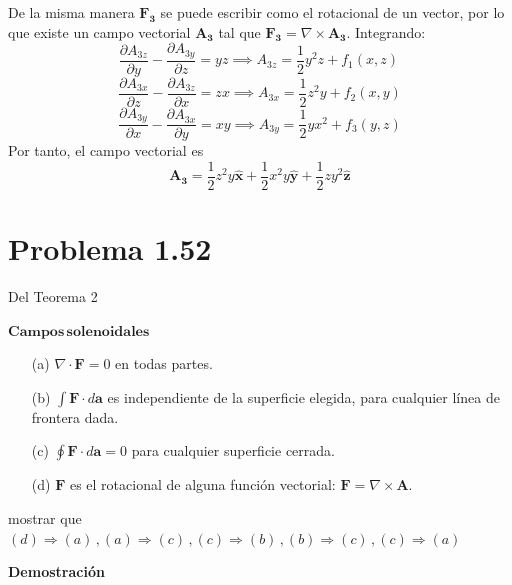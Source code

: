 \documentclass[12pt]{article}
\begin{document}
\begin{enumerate}[(a)]
De la misma manera  \(\mathbf{F_3} \) se puede escribir como el rotacional de un vector, por lo que existe un campo vectorial \(\mathbf{A_3}\) tal que \(\mathbf{F_3} = \nabla \times \mathbf{A_3}\). Integrando:
    \[
    \frac{\partial A_{3z}}{\partial y} - \frac{\partial A_{3y}}{\partial z} = yz \implies A_{3z} = \frac{1}{2} y^2 z + f_1(x,z)\, 
    \]
    \[
    \frac{\partial A_{3x}}{\partial z} - \frac{\partial A_{3z}}{\partial x} = zx \implies A_{3x} = \frac{1}{2} z^2 y + f_2(x,y)
    \]
    \[
    \frac{\partial A_{3y}}{\partial x} - \frac{\partial A_{3x}}{\partial y} = xy \implies A_{3y} = \frac{1}{2} y x^2 + f_3(y,z)
    \]
    Por tanto, el campo vectorial es 
    \[\boxed{\mathbf{A_3} = \frac{1}{2} z^2 y \hat{\mathbf{x}} + \frac{1}{2} x^2 y \hat{\mathbf{y}} + \frac{1}{2} z y^2 \hat{\mathbf{z}}}\]
\end{enumerate}

\section*{\color{blue} Problema 1.52}
Del Teorema 2  

$\mathbf{Campos\, solenoidales}$

\begin{enumerate}
    \item[(a)] \(\nabla \cdot \mathbf{F} = 0\) en todas partes.

    \item[(b)] \(\displaystyle \int \mathbf{F} \cdot d\mathbf{a}\) es independiente de la superficie elegida, para cualquier línea de frontera dada.

    \item[(c)] \(\displaystyle \oint \mathbf{F} \cdot d\mathbf{a} = 0\) para cualquier superficie cerrada.

    \item[(d)] \(\mathbf{F}\) es el rotacional de alguna función vectorial: \(\mathbf{F} = \nabla \times \mathbf{A}\).
\end{enumerate}

 mostrar que \( (d)\Rightarrow (a)\,, (a) \Rightarrow (c)\,, (c)\Rightarrow (b) \,, (b) \Rightarrow (c)\,, (c)\Rightarrow(a)\)
 

\textbf{Demostración }
\end{document}
